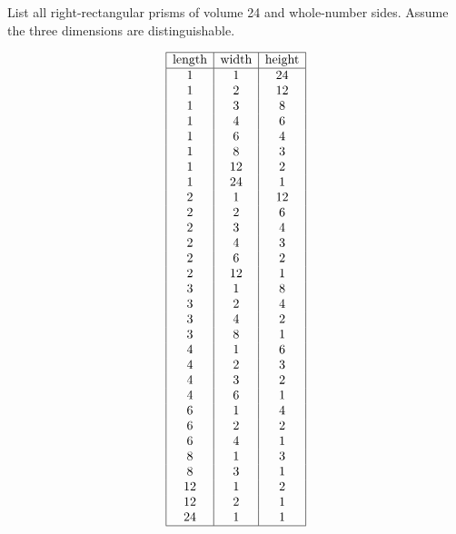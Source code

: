 \documentclass[nooutcomes]{ximera}
\begin{document}
\newpage
\begin{problem}
List all right-rectangular prisms of volume 24 and whole-number sides.  Assume the three dimensions are distinguishable. 
\begin{solution}
\[
\begin{array}{|c|c|c|}
\hline
\text{length} & \text{width} & \text{height} \\ 
\hline
1 & 1 & 24 \\
1 & 2 & 12 \\
1 & 3 & 8 \\
1 & 4 & 6 \\
1 & 6 & 4 \\
1 & 8 & 3 \\
1 & 12 & 2 \\
1 & 24 & 1 \\
2 & 1 & 12 \\
2 & 2 & 6 \\
2 & 3 & 4 \\
2 & 4 & 3 \\
2 & 6 & 2 \\
2 & 12 & 1 \\
3 & 1 & 8 \\
3 & 2 & 4 \\
3 & 4 & 2 \\
3 & 8 & 1 \\
4 & 1 & 6 \\
4 & 2 & 3 \\
4 & 3 & 2 \\
4 & 6 & 1 \\
6 & 1 & 4 \\
6 & 2 & 2 \\
6 & 4 & 1 \\
8 & 1 & 3 \\
8 & 3 & 1 \\
12 & 1 & 2 \\
12 & 2 & 1 \\
24 & 1 & 1 \\
\hline
\end{array}
\]
\end{solution}
\end{problem}
\end{document}
